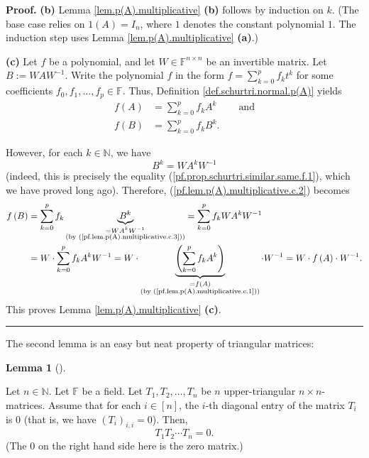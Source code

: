 \documentclass[numbers=enddot,12pt,final,onecolumn,notitlepage]{scrartcl}%
\numberwithin{exer}{subsection}
\theoremstyle{definition}
\newtheorem{lem}[theo]{Lemma}
\newenvironment{lemma}[1][]
{\begin{lem}[#1]\begin{leftbar}}
{\end{leftbar}\end{lem}}
\newenvironment{proof}[1][Proof]{\noindent\textbf{#1.} }{\ \rule{0.5em}{0.5em}}
\let\sumnonlimits\sum
\renewcommand{\sum}{\sumnonlimits\limits}
\begin{document}
\begin{proof}
\textbf{(b)} Lemma \ref{lem.p(A).multiplicative} \textbf{(b)} follows by
induction on $k$. (The base case relies on $1\left(  A\right)  =I_{n}$, where
$1$ denotes the constant polynomial $1$. The induction step uses Lemma
\ref{lem.p(A).multiplicative} \textbf{(a)}.) \medskip

\textbf{(c)} Let $f$ be a polynomial, and let $W\in\mathbb{F}^{n\times n}$ be
an invertible matrix. Let $B:=WAW^{-1}$. Write the polynomial $f$ in the form
$f=\sum_{k=0}^{p}f_{k}t^{k}$ for some coefficients $f_{0},f_{1},\ldots
,f_{p}\in\mathbb{F}$. Thus, Definition \ref{def.schurtri.normal.p(A)} yields%
\begin{align}
f\left(  A\right)   &  =\sum_{k=0}^{p}f_{k}A^{k}\ \ \ \ \ \ \ \ \ \ \text{and}%
\label{pf.lem.p(A).multiplicative.c.1}\\
f\left(  B\right)   &  =\sum_{k=0}^{p}f_{k}B^{k}.
\label{pf.lem.p(A).multiplicative.c.2}%
\end{align}


However, for each $k\in\mathbb{N}$, we have
\begin{equation}
B^{k}=WA^{k}W^{-1} \label{pf.lem.p(A).multiplicative.c.3}%
\end{equation}
(indeed, this is precisely the equality
(\ref{pf.prop.schurtri.similar.same.f.1}), which we have proved long ago).
Therefore, (\ref{pf.lem.p(A).multiplicative.c.2}) becomes%
\begin{align*}
f\left(  B\right)   &  =\sum_{k=0}^{p}f_{k}\underbrace{B^{k}}%
_{\substack{=WA^{k}W^{-1}\\\text{(by (\ref{pf.lem.p(A).multiplicative.c.3}))}%
}}=\sum_{k=0}^{p}f_{k}WA^{k}W^{-1}\\
&  =W\cdot\sum_{k=0}^{p}f_{k}A^{k}W^{-1}=W\cdot\underbrace{\left(  \sum
_{k=0}^{p}f_{k}A^{k}\right)  }_{\substack{=f\left(  A\right)  \\\text{(by
(\ref{pf.lem.p(A).multiplicative.c.1}))}}}\cdot W^{-1}=W\cdot f\left(
A\right)  \cdot W^{-1}.
\end{align*}
This proves Lemma \ref{lem.p(A).multiplicative} \textbf{(c)}.
\end{proof}

The second lemma is an easy but neat property of triangular matrices:

\begin{lemma}
\label{lem.uptri.prod=0}Let $n\in\mathbb{N}$. Let $\mathbb{F}$ be a field. Let
$T_{1},T_{2},\ldots,T_{n}$ be $n$ upper-triangular $n\times n$-matrices.
Assume that for each $i\in\left[  n\right]  $, the $i$-th diagonal entry of
the matrix $T_{i}$ is $0$ (that is, we have $\left(  T_{i}\right)  _{i,i}=0$).
Then,%
\[
T_{1}T_{2}\cdots T_{n}=0.
\]
(The $0$ on the right hand side here is the zero matrix.)
\end{lemma}
\end{document}
